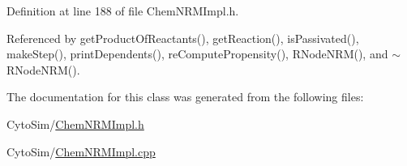 Definition at line 188 of file Chem\-N\-R\-M\-Impl.\-h.



Referenced by get\-Product\-Of\-Reactants(), get\-Reaction(), is\-Passivated(), make\-Step(), print\-Dependents(), re\-Compute\-Propensity(), R\-Node\-N\-R\-M(), and $\sim$\-R\-Node\-N\-R\-M().



The documentation for this class was generated from the following files\-:\begin{DoxyCompactItemize}
\item 
Cyto\-Sim/\hyperlink{ChemNRMImpl_8h}{Chem\-N\-R\-M\-Impl.\-h}\item 
Cyto\-Sim/\hyperlink{ChemNRMImpl_8cpp}{Chem\-N\-R\-M\-Impl.\-cpp}\end{DoxyCompactItemize}
